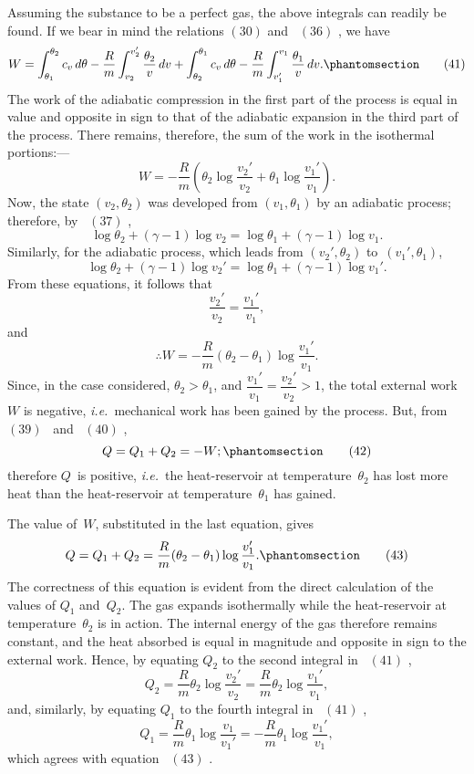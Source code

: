 \documentclass[12pt]{book}[2005/09/16]
\newcommand{\Chg}[2]{#2}
\newcommand{\Add}[1]{\Chg{}{#1}}
\newcommand{\Tag}[1]{%
  \phantomsection\label{eqn:#1}\tag*{\ensuremath{#1}}%
}
\newcommand{\Eq}[1]{%
  \hyperref[eqn:#1]{\ensuremath{#1}}%
}
\newcommand{\PageSep}[1]{\ignorespaces}
\newcommand{\ie}{\emph{i.e.}}
\begin{document}
Assuming the substance to be a perfect gas, the above
integrals can readily be found. If we bear in mind the
relations \Eq{(30)} and~\Eq{(36)}, we have
\[
W = \int_{\theta_{1}}^{\theta_{2}} c_{v}\, d\theta
  - \frac{R}{m} \int_{v_{2}}^{v_{2}'} \frac{\theta_{2}}{v}\, dv
  + \int_{\theta_{2}}^{\theta_{1}} c_{v}\, d\theta
  - \frac{R}{m} \int_{v_{1}'}^{v_{1}} \frac{\theta_{1}}{v}\, dv\Add{.}
\Tag{(41)}
\]
The work of the adiabatic compression in the first part of
the process is equal in value and opposite in sign to that
of the adiabatic expansion in the third part of the process.
\PageSep{64}
There remains, therefore, the sum of the work in the
isothermal portions\Add{:}---
\[
W = -\frac{R}{m} \left(\theta_{2} \log \frac{v_{2}'}{v_{2}} + \theta_{1} \log \frac{v_{1}'}{v_{1}}\right).
\]
Now, the state $(v_{2}, \theta_{2})$ was developed from $(v_{1}, \theta_{1})$ by an
adiabatic process; therefore, by~\Eq{(37)},
\[
\log \theta_{2} + (\gamma - 1) \log v_{2}
  = \log \theta_{1} + (\gamma - 1) \log v_{1}.
\]
Similarly, for the adiabatic process, which leads from $(v_{2}', \theta_{2})$
to~$(v_{1}', \theta_{1})$,
\[
\log \theta_{2} + (\gamma - 1) \log v_{2}'
  = \log \theta_{1} + (\gamma - 1) \log v_{1}'.
\]
From these equations, it follows that
\[
\frac{v_{2}'}{v_{2}} = \frac{v_{1}'}{v_{1}},
\]
and
\[
\therefore
W = -\frac{R}{m} (\theta_{2} - \theta_{1}) \log \frac{v_{1}'}{v_{1}}.
\]
Since, in the case considered, $\theta_{2} > \theta_{1}$, and $\dfrac{v_{1}'}{v_{1}} = \dfrac{v_{2}'}{v_{2}} > 1$,
the total external work~$W$ is negative, \ie\ mechanical work
has been gained by the process. But, from \Eq{(39)}~and~\Eq{(40)},
\[
Q = Q_{1} + Q_{2}= -W;
\Tag{(42)}
\]
therefore $Q$~is positive, \ie\ the heat-reservoir at temperature~$\theta_{2}$
has lost more heat than the heat-reservoir at temperature~$\theta_{1}$
has gained.

The value of~$W$, substituted in the last equation,
gives
\[
Q = Q_{1} + Q_{2} = \frac{R}{m} (\theta_{2} - \theta_{1}) \log \frac{v_{1}'}{v_{1}}.
\Tag{(43)}
\]
The correctness of this equation is evident from the direct
calculation of the values of $Q_{1}$ and~$Q_{2}$. The gas expands
isothermally while the heat-reservoir at temperature~$\theta_{2}$ is
in action. The internal energy of the gas therefore remains
constant, and the heat absorbed is equal in magnitude and
\PageSep{65}
opposite in sign to the external work. Hence, by equating
$Q_{2}$ to the second integral in~\Eq{(41)},
\[
Q_{2} = \frac{R}{m} \theta_{2} \log \frac{v_{2}'}{v_{2}}
     = \frac{R}{m} \theta_{2} \log \frac{v_{1}'}{v_{1}},
\]
and, similarly, by equating $Q_{1}$ to the fourth integral in~\Eq{(41)},
\[
Q_{1} = \frac{R}{m} \theta_{1} \log \frac{v_{1}}{v_{1}'}
     = -\frac{R}{m} \theta_{1} \log \frac{v_{1}'}{v_{1}},
\]
which agrees with equation~\Eq{(43)}.
\end{document}
